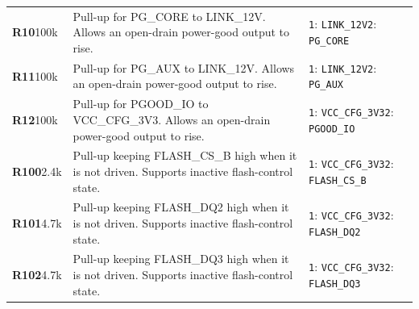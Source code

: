 \documentclass[11pt,a4paper]{article}
\begin{document}
\begin{longtable}{@{}P{27mm}P{84mm}P{57mm}@{}}
\textbf{R10}\newline 100k & Pull-up for PG\_CORE to LINK\_12V. Allows an open-drain power-good output to rise. & \nolinkurl{1}: \nolinkurl{LINK_12V}\newline \nolinkurl{2}: \nolinkurl{PG_CORE} \\
\textbf{R11}\newline 100k & Pull-up for PG\_AUX to LINK\_12V. Allows an open-drain power-good output to rise. & \nolinkurl{1}: \nolinkurl{LINK_12V}\newline \nolinkurl{2}: \nolinkurl{PG_AUX} \\
\textbf{R12}\newline 100k & Pull-up for PGOOD\_IO to VCC\_CFG\_3V3. Allows an open-drain power-good output to rise. & \nolinkurl{1}: \nolinkurl{VCC_CFG_3V3}\newline \nolinkurl{2}: \nolinkurl{PGOOD_IO} \\
\textbf{R100}\newline 2.4k & Pull-up keeping FLASH\_CS\_B high when it is not driven. Supports inactive flash-control state. & \nolinkurl{1}: \nolinkurl{VCC_CFG_3V3}\newline \nolinkurl{2}: \nolinkurl{FLASH_CS_B} \\
\textbf{R101}\newline 4.7k & Pull-up keeping FLASH\_DQ2 high when it is not driven. Supports inactive flash-control state. & \nolinkurl{1}: \nolinkurl{VCC_CFG_3V3}\newline \nolinkurl{2}: \nolinkurl{FLASH_DQ2} \\
\textbf{R102}\newline 4.7k & Pull-up keeping FLASH\_DQ3 high when it is not driven. Supports inactive flash-control state. & \nolinkurl{1}: \nolinkurl{VCC_CFG_3V3}\newline \nolinkurl{2}: \nolinkurl{FLASH_DQ3} \\

\end{longtable}
\end{document}
